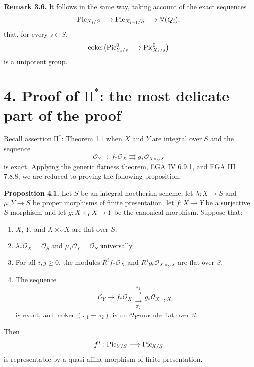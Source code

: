 \textbf{Remark 3.6.} It follows in the same way, taking account of the exact
sequences
\[
  \operatorname{Pic}_{X_i/S}\longrightarrow\operatorname{Pic}_{X_{i-1}/S}
  \longrightarrow\mathbb V(Q_i),
\]
that, for every $s\in S$,
\[
  \operatorname{coker}\bigl(
    \operatorname{Pic}^0_{Y_s/s}\longrightarrow\operatorname{Pic}^0_{X_s/s}
  \bigr)
\]
is a unipotent group.

\section*{4. Proof of $\mathrm{II}^*$: the most delicate part of the proof}

Recall assertion $\mathrm{II}^*$: \hyperlink{sga6.e12.thm.1-1}{Theorem 1.1} when $X$ and $Y$ are integral
over $S$ and the sequence
\[
  \mathcal O_Y\longrightarrow f_*\mathcal O_X
  \rightrightarrows g_*\mathcal O_{X\times_YX}
\]
is exact. Applying the generic flatness theorem, EGA IV 6.9.1, and EGA III
7.8.8, we are reduced to proving the following proposition.

\textbf{Proposition 4.1.} Let $S$ be an integral noetherian scheme, let
$\lambda:X\to S$ and $\mu:Y\to S$ be proper morphisms of finite
presentation, let $f:X\to Y$ be a surjective $S$-morphism, and let
$g:X\times_YX\to Y$ be the canonical morphism. Suppose that:
\begin{enumerate}[label=\arabic*)]
\item $X$, $Y$, and $X\times_YX$ are flat over $S$.
\item $\lambda_*\mathcal O_X=\mathcal O_S$ and
  $\mu_*\mathcal O_Y=\mathcal O_S$ universally.

\item For all $i,j\geq0$, the modules $R^if_*\mathcal O_X$ and
  $R^jg_*\mathcal O_{X\times_YX}$ are flat over $S$.
\item The sequence
  \begin{equation}\tag{*}
    \mathcal O_Y\longrightarrow f_*\mathcal O_X
    \mathrel{\substack{\xrightarrow{\pi_1}\\[-0.7ex]
                       \xrightarrow[\pi_2]{}}}
    g_*\mathcal O_{X\times_YX}
  \end{equation}
  is exact, and $\operatorname{coker}(\pi_1-\pi_2)$ is an
  $\mathcal O_Y$-module flat over $S$.
\end{enumerate}
Then
\[
  f^*:\operatorname{Pic}_{Y/S}\longrightarrow\operatorname{Pic}_{X/S}
\]
is representable by a quasi-affine morphism of finite presentation.

